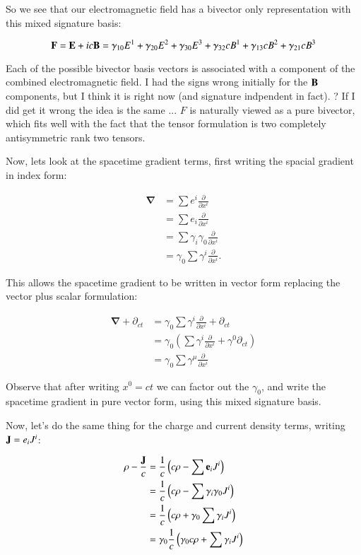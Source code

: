 \documentclass{article}      %
\newcommand{\spacegrad}[0]{\boldsymbol{\nabla}}
\begin{document}
So we see that our electromagnetic field has a bivector only representation with this mixed signature basis:

\begin{equation}
\mathbf{F} = \mathbf{E} + ic\mathbf{B} = \gamma_{10} E^1 +\gamma_{20} E^2 +\gamma_{30} E^3 +\gamma_{32} c B^1 +\gamma_{13} c B^2 +\gamma_{21} c B^3 
\end{equation}

Each of the possible bivector basis vectors is associated with a component of the combined electromagnetic field.
I had the signs wrong initially for the $\mathbf{B}$ components, but I think it is right now (and signature indpendent in fact).  ?  If I did get it wrong the idea is the same ... $F$ is naturally
viewed as a pure bivector, which fits well with the fact that the tensor formulation is two completely antisymmetric rank two tensors.

Now, lets look at the spacetime gradient terms, first writing the spacial gradient in index form:

\begin{align*}
\spacegrad 
&= \sum e^i \frac{\partial}{\partial x^i} \\
&= \sum e_i \frac{\partial}{\partial x^i} \\
&= \sum \gamma_i \gamma_0 \frac{\partial}{\partial x^i} \\
&= \gamma_0 \sum \gamma^i \frac{\partial}{\partial x^i}.
\end{align*}

This allows the spacetime gradient to be written in vector form replacing the vector plus scalar formulation:

\begin{align*}
\spacegrad + \partial_{ct}
&= \gamma_0 \sum \gamma^i \frac{\partial}{\partial x^i} + \partial_{ct} \\
&= \gamma_0 \left(\sum \gamma^i \frac{\partial}{\partial x^i} + \gamma^0 \partial_{ct} \right) \\
&= \gamma_0 \sum \gamma^{\mu} \frac{\partial}{\partial x^i} 
\end{align*}

Observe that after writing $x^0 = ct$ we can factor out the $\gamma_0$, and write the spacetime gradient in pure vector form, using this mixed signature basis.

Now, let's do the same thing for the charge and current density terms, writing $\mathbf{J} = e_i J^i$:

\begin{align*}
\rho - \frac{\mathbf{J}}{c}
&= \frac{1}{c} \left( c\rho - \sum \mathbf{e}_i J^i \right) \\
&= \frac{1}{c} \left( c\rho - \sum \gamma_i \gamma_0 J^i \right) \\
&= \frac{1}{c} \left( c\rho + \gamma_0 \sum \gamma_i J^i \right) \\
&= \gamma_0 \frac{1}{c} \left( \gamma_0 c \rho + \sum \gamma_i J^i \right) \\
\end{align*}
\end{document}
